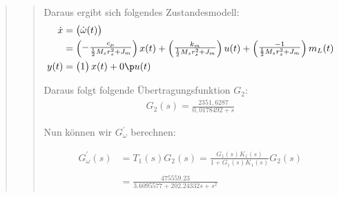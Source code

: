 \begin{quote}
\begin{quote}
        Daraus ergibt sich folgendes Zustandesmodell:
        \begin{equation*}
            \begin{split}
                   \dot{x} &=
                   \begin{pmatrix}
                        \dot{\omega}(t)\\
                   \end{pmatrix}\\ &=
                   \begin{pmatrix}
                        -\frac{c_\mu}{\frac{1}{2}M_s r^2_s + J_m}\\
                   \end{pmatrix} x(t) +
                   \begin{pmatrix}
                       \frac{k_m}{\frac{1}{2}M_sr^2_s + J_m}\\
                   \end{pmatrix} u(t) +
                   \begin{pmatrix}
                       \frac{-1}{\frac{1}{2}M_sr^2_s + J_m}\\
                   \end{pmatrix} m_L(t)\\
                   y(t) &= 
                   \begin{pmatrix}
                        1\\
                   \end{pmatrix} x(t) + 0 \p u(t)
            \end{split}
        \end{equation*}
        
        Daraus folgt folgende Übertragungsfunktion $G_2$:
        \begin{equation*}
        	\begin{split}
        		G_2 (s) = \frac{2351,6287}{0,0178492 + s}
        	\end{split}
        \end{equation*}
        
        Nun können wir $G_\omega^{'}$ berechnen:
	
		\begin{equation*}
        	\begin{split}
        		G_\omega^{'} (s) &= T_1(s) G_2(s) = \frac{G_1 (s) K_1(s)}{1 + G_1 (s) K_1 (s)} G_2 (s)\\ \\
        		&= \frac{475559.23}{3.6095577 + 202.24332s + s^2}
        	\end{split}
        \end{equation*}
		

\end{quote}
\end{quote}
